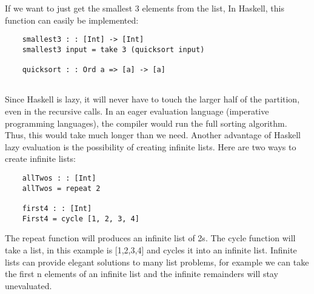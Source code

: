 \documentclass{article}
\begin{document}
If we want to just get the smallest 3 elements from the list, In Haskell, this  function can easily be implemented:
\begin{lstlisting}
	smallest3 : : [Int] -> [Int]
	smallest3 input = take 3 (quicksort input)

	quicksort : : Ord a => [a] -> [a] 
	
\end{lstlisting}
Since Haskell is lazy, it will never have to touch the larger half of the partition, even in the recursive calls. In an eager evaluation language (imperative programming languages), the compiler would run the full sorting algorithm. Thus, this would take much longer than we need.
\newline \newline Another advantage of Haskell lazy evaluation is the possibility of creating infinite lists. Here are two ways to create infinite lists:
\begin{lstlisting}
	allTwos : : [Int]
 	allTwos = repeat 2

	first4 : : [Int]
	First4 = cycle [1, 2, 3, 4] 
\end{lstlisting}
The repeat function will produces an infinite list of 2s.
\newline \newline The cycle function will take a list, in this example is [1,2,3,4] and cycles it into an infinite list.
\newline \newline Infinite lists can provide elegant solutions to many list problems, for example we can take the first n elements of an infinite list and the infinite remainders will stay unevaluated.
\end{document}
